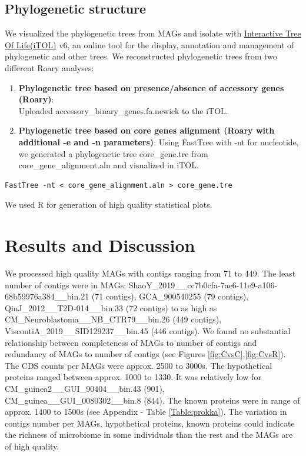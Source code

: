 \documentclass[11pt]{article}
\begin{document}
\subsection{Phylogenetic structure}
We visualized the phylogenetic trees from MAGs and isolate with \href{https://itol.embl.de/}{Interactive Tree Of Life(iTOL)} v6, an online tool for the display, annotation and management of phylogenetic and other trees\cite{Letunic2021}.
We reconstructed phylogenetic trees from two different Roary analyses: 
\begin{enumerate}
\item \textbf{Phylogenetic tree based on presence/absence of accessory genes (Roary)}: \\Uploaded  accessory\_binary\_genes.fa.newick to the iTOL.
\item \textbf{Phylogenetic tree based on core genes alignment (Roary with additional -e and -n parameters)}:  Using FastTree\cite{Price2009} with -nt for nucleotide, we generated a phylogenetic tree core\_gene.tre from core\_gene\_alignment.aln and visualized in iTOL. \end{enumerate}
\begin{lstlisting}
FastTree -nt < core_gene_alignment.aln > core_gene.tre
\end{lstlisting}
We used R\cite{R} for generation of high quality statistical plots.


\section{Results and Discussion}

We processed high quality MAGs with contigs ranging from 71 to 449. The least number of contigs were in MAGs: ShaoY\_2019\_\_cc7b0cfa-7ae6-11e9-a106-68b59976a384\_\_bin.21 (71 contigs), GCA\_900540255 (79 contigs),  QinJ\_2012\_\_T2D-014\_\_bin.33 (72 contigs) to as high as CM\_Neuroblastoma\_\_NB\_CTR79\_\_bin.26 (449 contigs), ViscontiA\_2019\_\_SID129237\_\_bin.45 (446 contigs). We found no substantial relationship between completeness of MAGs to number of contigs and redundancy of MAGs to number of contigs (see Figures \ref{fig:CvsC},\ref{fig:CvsR}). The CDS counts per MAGs were approx. 2500 to 3000s. The hypothetical proteins ranged between approx. 1000 to 1330. It was relatively low for CM\_guinea2\_\_GUI\_90404\_\_bin.43 (901), CM\_guinea\_\_GUI\_0080302\_\_bin.8 (844). The known proteins were in range of approx. 1400 to 1500s (see Appendix - Table \ref{Table:prokka}). The variation in contigs number per MAGs, hypothetical proteins, known proteins could indicate the richness of microbiome in some individuals than the rest and the MAGs are of high quality. 
\end{document}
